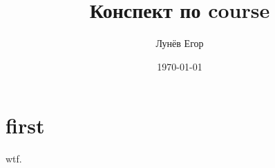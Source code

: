 \documentclass[12pt]{article}
\date{\today}
\author{Лунёв Егор}
\title{Конспект по course}
\theoremstyle{plain}
\theoremstyle{definition}
\begin{document}
\maketitle
\tableofcontents
\pagebreak
\section{first}
wtf.
\end{document}
